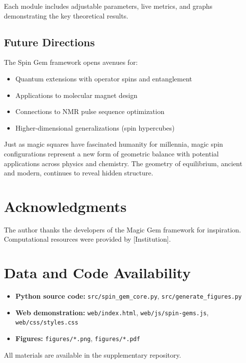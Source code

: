 Each module includes adjustable parameters, live metrics, and graphs demonstrating the key theoretical results.

\subsection{Future Directions}

The Spin Gem framework opens avenues for:
\begin{itemize}
    \item Quantum extensions with operator spins and entanglement
    \item Applications to molecular magnet design
    \item Connections to NMR pulse sequence optimization
    \item Higher-dimensional generalizations (spin hypercubes)
\end{itemize}

Just as magic squares have fascinated humanity for millennia, magic spin configurations represent a new form of geometric balance with potential applications across physics and chemistry. The geometry of equilibrium, ancient and modern, continues to reveal hidden structure.

\section*{Acknowledgments}

The author thanks the developers of the Magic Gem framework for inspiration. Computational resources were provided by [Institution].

\section*{Data and Code Availability}

\begin{itemize}
    \item \textbf{Python source code:} \texttt{src/spin\_gem\_core.py}, \texttt{src/generate\_figures.py}
    \item \textbf{Web demonstration:} \texttt{web/index.html}, \texttt{web/js/spin-gems.js}, \texttt{web/css/styles.css}
    \item \textbf{Figures:} \texttt{figures/*.png}, \texttt{figures/*.pdf}
\end{itemize}

All materials are available in the supplementary repository.
